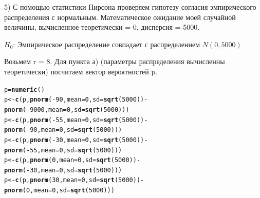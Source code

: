 \documentclass{article}\usepackage[]{graphicx}\usepackage[]{color}
\makeatletter
\newcommand{\hlnum}[1]{\textcolor[rgb]{0.686,0.059,0.569}{#1}}%
\newcommand{\hlopt}[1]{\textcolor[rgb]{0,0,0}{#1}}%
\newcommand{\hlstd}[1]{\textcolor[rgb]{0.345,0.345,0.345}{#1}}%
\newcommand{\hlkwb}[1]{\textcolor[rgb]{0.69,0.353,0.396}{#1}}%
\newcommand{\hlkwc}[1]{\textcolor[rgb]{0.333,0.667,0.333}{#1}}%
\newcommand{\hlkwd}[1]{\textcolor[rgb]{0.737,0.353,0.396}{\textbf{#1}}}%
\newenvironment{kframe}{%
 \def\at@end@of@kframe{}%
 \ifinner\ifhmode%
  \def\at@end@of@kframe{\end{minipage}}%
  \begin{minipage}{\columnwidth}%
 \fi\fi%
 \def\FrameCommand##1{\hskip\@totalleftmargin \hskip-\fboxsep
 \colorbox{shadecolor}{##1}\hskip-\fboxsep
     \hskip-\linewidth \hskip-\@totalleftmargin \hskip\columnwidth}%
 \MakeFramed {\advance\hsize-\width
   \@totalleftmargin\z@ \linewidth\hsize
   \@setminipage}}%
 {\par\unskip\endMakeFramed%
 \at@end@of@kframe}
\newenvironment{knitrout}{}{} %
\makeatother
\begin{document}
\newpage

5) С помощью статистики Пирсона проверяем гипотезу согласия эмпирического распределения с нормальным.
Математическое ожидание моей случайной величины, вычисленное теоретически = 0, дисперсия = 5000. 

$H_0$: Эмпирическое распределение совпадает с распределением $N(0, 5000)$


Возьмем r = 8. Для пункта а) (параметры распределения вычисленны теоретически) посчитаем вектор вероятностей p.

\begin{knitrout}
\color{fgcolor}\begin{kframe}
\begin{alltt}
\hlstd{p} \hlkwb{=} \hlkwd{numeric}\hlstd{()}
\hlstd{p} \hlkwb{<-}  \hlkwd{c}\hlstd{(p,} \hlkwd{pnorm}\hlstd{(}\hlopt{-}\hlnum{90}\hlstd{,} \hlkwc{mean} \hlstd{=} \hlnum{0}\hlstd{,} \hlkwc{sd} \hlstd{=} \hlkwd{sqrt}\hlstd{(}\hlnum{5000}\hlstd{))} \hlopt{-}
    \hlkwd{pnorm}\hlstd{(}\hlopt{-}\hlnum{9000}\hlstd{,} \hlkwc{mean} \hlstd{=} \hlnum{0}\hlstd{,} \hlkwc{sd} \hlstd{=} \hlkwd{sqrt}\hlstd{(}\hlnum{5000}\hlstd{)))}
\hlstd{p} \hlkwb{<-} \hlkwd{c}\hlstd{(p,} \hlkwd{pnorm}\hlstd{(}\hlopt{-}\hlnum{55}\hlstd{,} \hlkwc{mean} \hlstd{=} \hlnum{0}\hlstd{,} \hlkwc{sd} \hlstd{=} \hlkwd{sqrt}\hlstd{(}\hlnum{5000}\hlstd{))} \hlopt{-}
           \hlkwd{pnorm}\hlstd{(}\hlopt{-}\hlnum{90}\hlstd{,} \hlkwc{mean} \hlstd{=} \hlnum{0}\hlstd{,} \hlkwc{sd} \hlstd{=} \hlkwd{sqrt}\hlstd{(}\hlnum{5000}\hlstd{)))}
\hlstd{p} \hlkwb{<-} \hlkwd{c}\hlstd{(p,} \hlkwd{pnorm}\hlstd{(}\hlopt{-}\hlnum{30}\hlstd{,} \hlkwc{mean} \hlstd{=} \hlnum{0}\hlstd{,} \hlkwc{sd} \hlstd{=} \hlkwd{sqrt}\hlstd{(}\hlnum{5000}\hlstd{))} \hlopt{-}
           \hlkwd{pnorm}\hlstd{(}\hlopt{-}\hlnum{55}\hlstd{,} \hlkwc{mean} \hlstd{=} \hlnum{0}\hlstd{,} \hlkwc{sd} \hlstd{=} \hlkwd{sqrt}\hlstd{(}\hlnum{5000}\hlstd{)))}
\hlstd{p} \hlkwb{<-} \hlkwd{c}\hlstd{(p,} \hlkwd{pnorm}\hlstd{(}\hlnum{0}\hlstd{,} \hlkwc{mean} \hlstd{=} \hlnum{0}\hlstd{,} \hlkwc{sd} \hlstd{=} \hlkwd{sqrt}\hlstd{(}\hlnum{5000}\hlstd{))} \hlopt{-}
           \hlkwd{pnorm}\hlstd{(}\hlopt{-}\hlnum{30}\hlstd{,} \hlkwc{mean} \hlstd{=} \hlnum{0}\hlstd{,} \hlkwc{sd} \hlstd{=} \hlkwd{sqrt}\hlstd{(}\hlnum{5000}\hlstd{)))}
\hlstd{p} \hlkwb{<-} \hlkwd{c}\hlstd{(p,} \hlkwd{pnorm}\hlstd{(}\hlnum{30}\hlstd{,} \hlkwc{mean} \hlstd{=} \hlnum{0}\hlstd{,} \hlkwc{sd} \hlstd{=} \hlkwd{sqrt}\hlstd{(}\hlnum{5000}\hlstd{))} \hlopt{-}
           \hlkwd{pnorm}\hlstd{(}\hlnum{0}\hlstd{,} \hlkwc{mean} \hlstd{=} \hlnum{0}\hlstd{,} \hlkwc{sd} \hlstd{=} \hlkwd{sqrt}\hlstd{(}\hlnum{5000}\hlstd{)))}

\end{alltt}
\end{kframe}
\end{knitrout}
\end{document}
